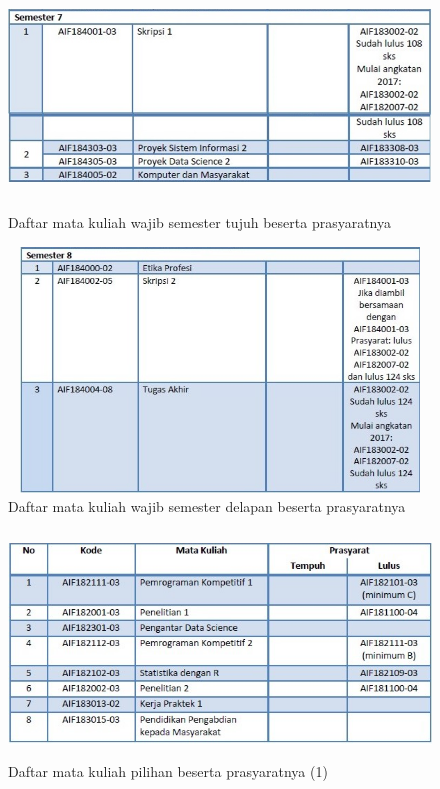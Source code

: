 \begin{figure}[H]
    \centering
    \includegraphics[width=12cm, height=6cm]{Gambar/Prasyarat MK Wajib Sem 7.jpg}
    \caption{Daftar mata kuliah wajib semester tujuh beserta prasyaratnya}
    \label{fig:gambarSem7}
\end{figure}

\begin{figure}[H]
    \centering
    \includegraphics[width=12cm, height=6.5cm]{Gambar/Prasyarat MK Wajib Sem 8.jpg}
    \caption{Daftar mata kuliah wajib semester delapan beserta prasyaratnya}
    \label{fig:gambarSem8}
\end{figure}




\begin{figure}[H]
    \centering
    \includegraphics[width=12cm, height=6cm]{Gambar/Prasyarat MK Pilihan 1.jpg}
    \caption{Daftar mata kuliah pilihan beserta prasyaratnya (1)}
    \label{fig:gambar11}
\end{figure}

